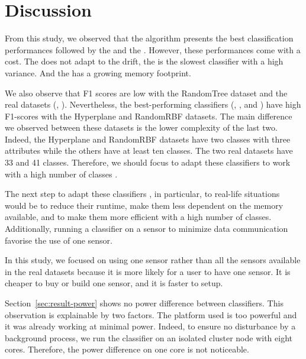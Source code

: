 \section{Discussion}
From this study, we observed that the \hoeffdingtree algorithm presents the
best classification performances followed by the \naivebayes and the
\mondrianforest.  However, these performances come with a cost.  The
\naivebayes does not adapt to the drift, the \mondrianforest is the slowest
classifier with a high variance. And the \hoeffdingtree has a growing memory
footprint.

We also observe that F1 scores are low with the RandomTree dataset and
the real datasets (\banosdataset, \recofitdataset). Nevertheless, the best-performing classifiers (\mondrianforest, \hoeffdingtree, and \naivebayes) have high
F1-scores with the Hyperplane and RandomRBF datasets. The main difference we
observed between these datasets is the lower complexity of the last two.
Indeed, the Hyperplane and RandomRBF datasets have two classes with three
attributes while the others have at least ten classes. The two real datasets
have 33 and 41 classes. Therefore, we should focus to adapt these classifiers
to work with a high number of classes .

The next step to adapt these classifiers , \mondrianforest in particular, to real-life
situations would be to reduce their runtime, make them less dependent on the
memory available, and to make them more efficient with a high number of
classes. Additionally, running a classifier on a sensor to minimize data
communication favorise the use of one sensor.


In this study, we focused on using one sensor rather than all the sensors
available in the real datasets because it is more likely for a user to have one
sensor. It is cheaper to buy or build one sensor, and it is faster to setup.


Section~\ref{sec:result-power} shows no power difference between classifiers. This
observation is explainable by two factors. The platform used is too powerful
and it was already working at minimal power. Indeed, to ensure no disturbance
by a background process, we run the classifier on an isolated cluster node with
eight cores. Therefore, the power difference on one core is not noticeable.

